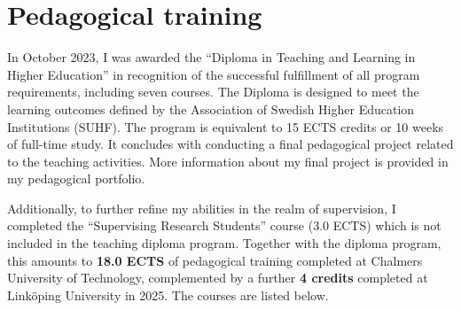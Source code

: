 \newpage
\section{Pedagogical training}{}

In October 2023, I was awarded the ``Diploma in Teaching and Learning in Higher Education'' in recognition of the successful fulfillment of all program requirements, including seven courses. The Diploma is designed to meet the learning outcomes defined by the Association of Swedish Higher Education Institutions (SUHF). The program is equivalent to 15 ECTS credits or 10 weeks of full-time study. It concludes with conducting a final pedagogical project related to the teaching activities. More information about my final project is provided in my pedagogical portfolio.

Additionally, to further refine my abilities in the realm of supervision, I completed the ``Supervising Research Students'' course (3.0 ECTS) which is not included in the teaching diploma program. Together with the diploma program, this amounts to \textbf{18.0 ECTS} of pedagogical training completed at Chalmers University of Technology, complemented by a further \textbf{4 credits} completed at Linköping University in 2025. The courses are listed below.

